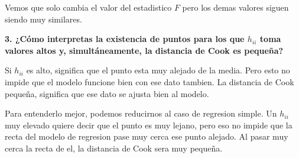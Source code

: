 \documentclass[]{article}
\begin{document}
Vemos que solo cambia el valor del estadistico \(F\) pero los demas
valores siguen siendo muy similares.

\textbf{3. ¿Cómo interpretas la existencia de puntos para los que
\(h_{ii}\) toma valores altos y, simultáneamente, la distancia de Cook
es pequeña?}

Si \(h_{ii}\) es alto, significa que el punto esta muy alejado de la
media. Pero esto no impide que el modelo funcione bien con ese dato
tambien. La distancia de Cook pequeña, significa que ese dato se ajusta
bien al modelo.

Para entenderlo mejor, podemos reducirnos al caso de regresion simple.
Un \(h_{ii}\) muy elevado quiere decir que el punto es muy lejano, pero
eso no impide que la recta del modelo de regresion pase muy cerca ese
punto alejado. Al pasar muy cerca la recta de el, la distancia de Cook
sera muy pequeña.
\end{document}
